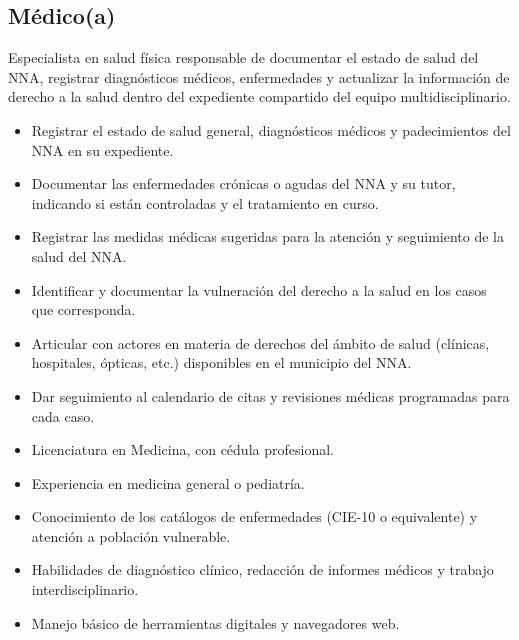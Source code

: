 \begin{Usuario}{\hypertarget{A.Medico}{\subsection{Médico(a)}}}{
		Especialista en salud física responsable de documentar el estado 
		de salud del NNA, registrar diagnósticos médicos, enfermedades 
		y actualizar la información de derecho a la salud dentro del 
		expediente compartido del equipo multidisciplinario.
	}
	\item[Responsabilidades:] \cdtEmpty
	\begin{itemize}
		\item Registrar el estado de salud general, diagnósticos médicos 
		y padecimientos del NNA en su expediente.
		\item Documentar las enfermedades crónicas o agudas del NNA y 
		su tutor, indicando si están controladas y el tratamiento en curso.
		\item Registrar las medidas médicas sugeridas para la atención 
		y seguimiento de la salud del NNA.
		\item Identificar y documentar la vulneración del derecho a la 
		salud en los casos que corresponda.
		\item Articular con actores en materia de derechos del ámbito 
		de salud (clínicas, hospitales, ópticas, etc.) disponibles en 
		el municipio del NNA.
		\item Dar seguimiento al calendario de citas y revisiones médicas 
		programadas para cada caso.
	\end{itemize}
	
	\item[Perfil:] \cdtEmpty
	\begin{itemize}
		\item Licenciatura en Medicina, con cédula profesional.
		\item Experiencia en medicina general o pediatría.
		\item Conocimiento de los catálogos de enfermedades (CIE-10 
		o equivalente) y atención a población vulnerable.
		\item Habilidades de diagnóstico clínico, redacción de informes 
		médicos y trabajo interdisciplinario.
		\item Manejo básico de herramientas digitales y navegadores web.
	\end{itemize}
	

\end{Usuario}
